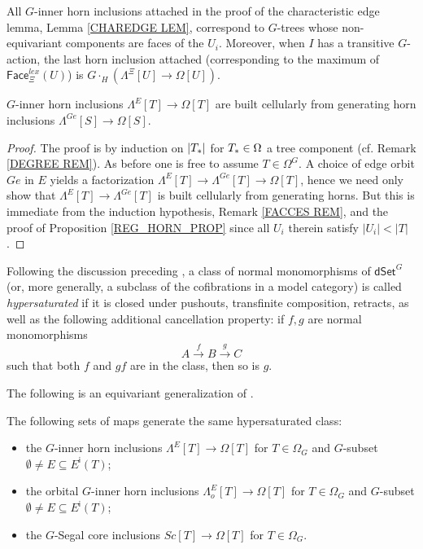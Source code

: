 \documentclass[a4paper,10pt
,draft
]{article}%
\begin{document}
\begin{remark}\label{FACCES REM}
All $G$-inner horn inclusions attached in the proof of the characteristic edge lemma, Lemma \ref{CHAREDGE LEM}, correspond to $G$-trees whose non-equivariant components are faces of the $U_i$. Moreover, when $I$ has a transitive $G$-action, the last horn inclusion attached (corresponding to the maximum of $\mathsf{Face}^{lex}_{\Xi}(U)$) is
$G \cdot_H \left( \Lambda^{\Xi}[U] \to \Omega[U] \right)$.
\end{remark}


\begin{corollary}\label{REGGENHORN COR}
$G$-inner horn inclusions
$\Lambda^{E}[T] \to \Omega[T]$
are built cellularly from generating horn inclusions
$\Lambda^{Ge}[S] \to \Omega[S]$.
\end{corollary}

\begin{proof}
	The proof is by induction on $|T_{\**}|$ for $T_{\**}\in \Omega$ a tree component (cf. Remark \ref{DEGREE REM}). As before one is free to assume $T \in \Omega^G$.	
	A choice of edge orbit $Ge$ in $E$ yields a factorization
	$\Lambda^{E}[T] \to \Lambda^{Ge}[T] \to \Omega[T]$,
	hence we need only show that 
	$\Lambda^{E}[T] \to \Lambda^{Ge}[T]$ is built cellularly from generating horns. 
	But this is immediate from the induction hypothesis,
	Remark \ref{FACCES REM}, and the proof of Proposition \ref{REG_HORN_PROP} since all
	$U_{i}$ therein satisfy $|U_i|<|T|$.
\end{proof}


Following the discussion preceding \cite[Prop. 3.6.8]{HHM16},
a class of normal monomorphisms of $\mathsf{dSet}^G$
(or, more generally, a subclass of the cofibrations in a model category) is called
\textit{hypersaturated} if it is closed under
pushouts, transfinite composition, retracts,
as well as the following additional cancellation property: 
if $f,g$ are normal monomorphisms
\begin{equation}\label{CANCEL_EQ}
A \xrightarrow{f} B \xrightarrow{g} C
\end{equation}
such that both $f$ and $gf$ are in the class, then so is $g$.

The following is an equivariant generalization of 
\cite[Props. 2.4 and 2.5]{CM13a}.

\begin{proposition}\label{HYPER PROP}
The following sets of maps generate the same hypersaturated class:
\begin{itemize}
\item the $G$-inner horn inclusions
$\Lambda^{E} [T] \to \Omega[T]$ for $T \in \Omega_G$ and 
$G$-subset $\emptyset \neq E \subseteq E^{\mathsf{i}}(T)$; 
\item the orbital $G$-inner horn inclusions
$\Lambda^{E}_o [T] \to \Omega[T]$ for $T \in \Omega_G$ and 
$G$-subset $\emptyset \neq E \subseteq E^{\mathsf{i}}(T)$; 
\item the $G$-Segal core inclusions
$Sc[T] \to \Omega[T]$ for $T \in \Omega_G$.
\end{itemize}
\end{proposition}
\end{document}
